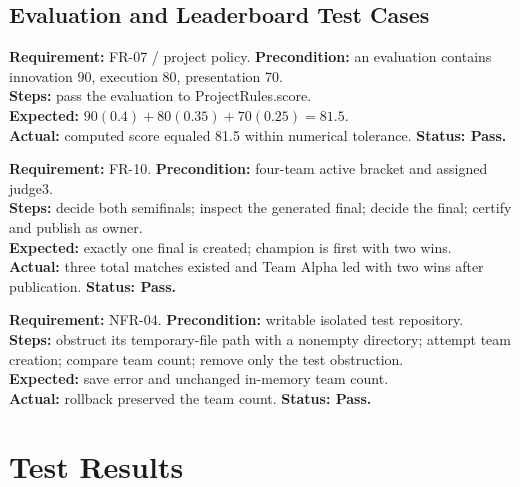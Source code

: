 \subsection{Evaluation and Leaderboard Test Cases}
\begin{contentbox}
\textbf{Requirement:} FR-07 / project policy. \textbf{Precondition:} an evaluation contains innovation 90, execution 80, presentation 70.\\
\textbf{Steps:} pass the evaluation to ProjectRules.score.\\
\textbf{Expected:} $90(0.4)+80(0.35)+70(0.25)=81.5$.\\
\textbf{Actual:} computed score equaled 81.5 within numerical tolerance. \textbf{Status: Pass.}
\end{contentbox}
\begin{contentbox}
\textbf{Requirement:} FR-10. \textbf{Precondition:} four-team active bracket and assigned judge3.\\
\textbf{Steps:} decide both semifinals; inspect the generated final; decide the final; certify and publish as owner.\\
\textbf{Expected:} exactly one final is created; champion is first with two wins.\\
\textbf{Actual:} three total matches existed and Team Alpha led with two wins after publication. \textbf{Status: Pass.}
\end{contentbox}
\begin{contentbox}
\textbf{Requirement:} NFR-04. \textbf{Precondition:} writable isolated test repository.\\
\textbf{Steps:} obstruct its temporary-file path with a nonempty directory; attempt team creation; compare team count; remove only the test obstruction.\\
\textbf{Expected:} save error and unchanged in-memory team count.\\
\textbf{Actual:} rollback preserved the team count. \textbf{Status: Pass.}
\end{contentbox}

\section{Test Results}
